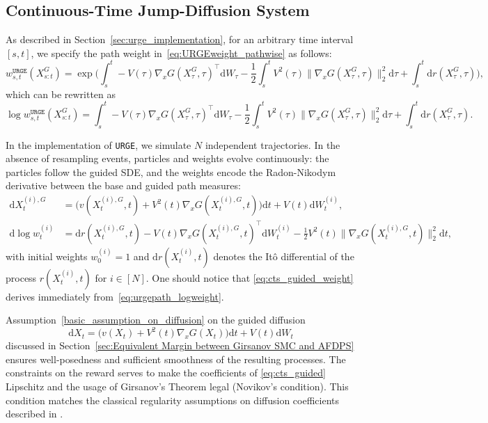 \documentclass{article}
\theoremstyle{plain}
\theoremstyle{definition}
\theoremstyle{remark}
\newcommand{\dif}{{\mathrm{d}}}
\begin{document}
\subsection{Continuous-Time Jump-Diffusion System}

As described in Section~\ref{sec:urge_implementation}, for an arbitrary time interval $[s, t]$, we specify the path weight in~\eqref{eq:URGEweight_pathwise} as follows:
\begin{equation*}
    w^{\texttt{URGE}}_{s,t}(X^G_{s:t}) = \exp\bigg(\int_s^t -V(\tau)\nabla_x G(X_\tau^G,\tau)^\top \dif W_\tau - \frac{1}{2} \int_s^t V^2(\tau)\|\nabla_x G(X_\tau^G,\tau)\|_2^2\dif \tau + \int_s^t \dif r(X_\tau^G,\tau)\bigg),
\end{equation*}
which can be rewritten as 
\begin{equation}
    \log w^{\texttt{URGE}}_{s,t}(X^G_{s:t}) = \int_s^t -V(\tau)\nabla_x G(X_\tau^G,\tau)^\top \dif W_\tau - \frac{1}{2} \int_s^t V^2(\tau)\|\nabla_x G(X_\tau^G,\tau)\|_2^2\dif \tau + \int_s^t \dif r(X_\tau^G,\tau).
    \label{eq:urgepath_logweight}
\end{equation}

In the implementation of \texttt{URGE}, we simulate \(N\) independent trajectories. In the absence of resampling events, particles and weights evolve continuously: the particles follow the guided SDE, and the weights encode the Radon-Nikodym derivative between the base and guided path measures:
\begin{subequations}
\begin{align}
\dif X_t^{(i),G} &= \big(v(X_t^{(i),G},t) + V^2(t) \nabla_x G(X_t^{(i),G},t)\big)\dif t+ V(t)\dif W_t^{(i)}, \label{eq:cts_guided_sde}\\
\dif\log w_t^{(i)} &= \dif r(X^{(i),G}_t,t)-V(t)\nabla_x G(X_t^{(i),G},t)^\top \dif W_t^{(i)}- \frac12 V^2(t)\|\nabla_x G(X_t^{(i),G},t)\|_2^2\dif t, \label{eq:cts_guided_weight}\end{align}\label{eq:cts_guided}\end{subequations}
with initial weights \(w_0^{(i)}=1\) and \(\dif r(X^{(i)}_t,t)\) denotes the It\^o differential of the process \(r(X^{(i)}_t,t)\) for $i \in [N]$. One should notice that \eqref{eq:cts_guided_weight} derives immediately from~\eqref{eq:urgepath_logweight}.

Assumption~\ref{basic_assumption_on_diffusion} on the guided diffusion 
\[\dif X_t = \big(v(X_t)+V^2(t)\nabla_x G(X_t)\big)\dif t + V(t)\dif W_t\]  discussed in Section~\ref{sec:Equivalent Margin between Girsanov SMC and AFDPS} ensures well-posedness and sufficient smoothness of the resulting processes. The constraints on the reward serves to make the coefficients of \eqref{eq:cts_guided} Lipschitz and the usage of Girsanov's Theorem legal (Novikov's condition). This condition matches the classical regularity assumptions on diffusion coefficients described in \cite{ethierkurtz1986, IkedaWatanabe1981}.
\end{document}
